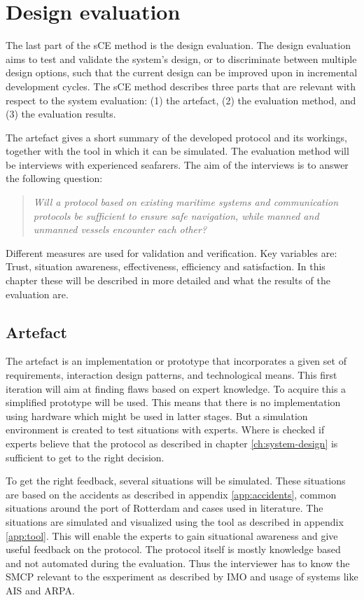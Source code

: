 \chapter{Design evaluation}
The last part of the sCE method is the design evaluation. The design evaluation aims to test and validate the system’s design, or to discriminate between multiple design options, such that the current design can be improved upon in incremental development cycles. The sCE method describes three parts that are relevant with respect to the system evaluation: (1) the artefact, (2) the evaluation method, and (3) the evaluation results.

The artefact gives a short summary of the developed protocol and its workings, together with the tool in which it can be simulated. The evaluation method will be interviews with experienced seafarers. The aim of the interviews is to answer the following question:
\begin{quotation}
	\emph{Will a protocol based on existing maritime systems and communication protocols be sufficient to ensure safe navigation, while manned and unmanned vessels encounter each other?}
\end{quotation}
Different measures are used for validation and verification. Key variables are: Trust, situation awareness, effectiveness, efficiency and satisfaction. In this chapter these will be described in more detailed and what the results of the evaluation are.

\section{Artefact}
The artefact is an implementation or prototype that incorporates a given set of requirements, interaction design patterns, and technological means. This first iteration will aim at finding flaws based on expert knowledge. To acquire this a simplified prototype will be used. This means that there is no implementation using hardware which might be used in latter stages. But a simulation environment is created to test situations with experts. Where is checked if experts believe that the protocol as described in chapter \ref{ch:system-design} is sufficient to get to the right decision. 

To get the right feedback, several situations will be simulated. These situations are based on the accidents as described in appendix \ref{app:accidents}, common situations around the port of Rotterdam and cases used in literature. The situations are simulated and visualized using the tool as described in appendix \ref{app:tool}. This will enable the experts to gain situational awareness and give useful feedback on the protocol. The protocol itself is mostly knowledge based and not automated during the evaluation. Thus the interviewer has to know the \acf{SMCP} relevant to the esxperiment as described by IMO \cite{IMO2000} and usage of systems like \acf{AIS} and \acf{ARPA}.


